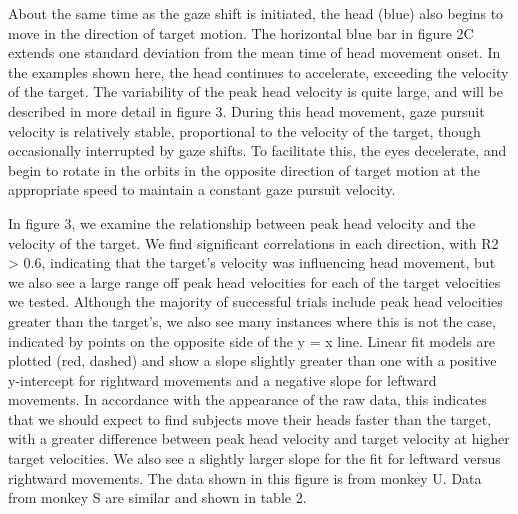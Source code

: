 \documentclass[12pt]{article}
\begin{document}
About the same time as the gaze shift is initiated, the head (blue) also begins to move in the direction of target motion. The horizontal blue bar in figure 2C extends one standard deviation from the mean time of head movement onset. In the examples shown here, the head continues to accelerate, exceeding the velocity of the target. The variability of the peak head velocity is quite large, and will be described in more detail in figure 3. During this head movement, gaze pursuit velocity is relatively stable, proportional to the velocity of the target, though occasionally interrupted by gaze shifts. To facilitate this, the eyes decelerate, and begin to rotate in the orbits in the opposite direction of target motion at the appropriate speed to maintain a constant gaze pursuit velocity.  

In figure 3, we examine the relationship between peak head velocity and the velocity of the target. We find significant correlations in each direction, with R2 > 0.6, indicating that the target’s velocity was influencing head movement, but we also see a large range off peak head velocities for each of the target velocities we tested. Although the majority of successful trials include peak head velocities greater than the target’s, we also see many instances where this is not the case, indicated by points on the opposite side of the y = x line. Linear fit models are plotted (red, dashed) and show a slope slightly greater than one with a positive y-intercept for rightward movements and a negative slope for leftward movements. In accordance with the appearance of the raw data, this indicates that we should expect to find subjects move their heads faster than the target, with a greater difference between peak head velocity and target velocity at higher target velocities. We also see a slightly larger slope for the fit for leftward versus rightward movements. The data shown in this figure is from monkey U. Data from monkey S are similar and shown in table 2. 
\end{document}
